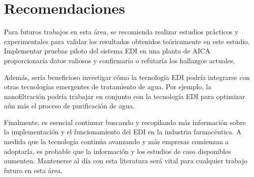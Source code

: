 \chapter*{Recomendaciones}
{}
Para futuros trabajos en esta área, se recomienda realizar estudios prácticos y
experimentales para validar los resultados obtenidos teóricamente en este estudio.
Implementar pruebas piloto del sistema EDI en una planta de AICA proporcionaría
datos valiosos y confirmaría o refutaría los hallazgos actuales.

Además, sería beneficioso investigar cómo la tecnología EDI podría integrarse
con otras tecnologías emergentes de tratamiento de agua. Por ejemplo,
la nanofiltración podría
trabajar en conjunto con la tecnología EDI para optimizar aún más el
proceso de purificación de agua.

Finalmente, es esencial continuar buscando y recopilando más información
sobre la implementación y el funcionamiento del EDI en la industria farmacéutica.
A medida que la tecnología continúa avanzando y más empresas comienzan a adoptarla,
es probable que la información y los estudios de caso disponibles aumenten.
Mantenerse al día con esta literatura será vital para cualquier trabajo futuro en esta área.